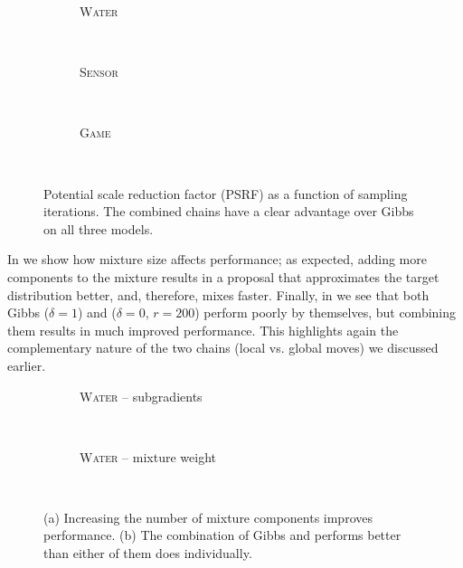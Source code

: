 \setlength{}
\setlength{}
\renewcommand{\subflen}{1.0\textwidth}
\begin{figure}[htbp]
  \begin{subfigure}[b]{\subflen}
    \centering
    
    \vspace{-0.5em}
    \caption{\textsc{Water}}
    \label{fig:water1}
  \end{subfigure}\\[1em]
  \begin{subfigure}[b]{\subflen}
    \centering
    
    \vspace{-0.5em}
    \caption{\textsc{Sensor}}
    \label{fig:berkeley1}
  \end{subfigure}\\[1em]
  \begin{subfigure}[b]{\subflen}
    \centering
    
    \vspace{-0.5em}
    \caption{\textsc{Game}}
    \label{fig:hots1}
  \end{subfigure}\\[-0.5em]
  \caption{
    Potential scale reduction factor (PSRF) as a function of sampling iterations.
    The combined chains have a clear advantage over Gibbs on all three models.
    }
  \label{fig:expsamples}
\end{figure}

In  we show how mixture size affects performance; as expected, adding more components to the mixture results in a proposal that approximates the target distribution better, and, therefore, mixes faster.
Finally, in  we see that both Gibbs ($\delta = 1$) and \Ms{} ($\delta = 0$, $r = 200$) perform poorly by themselves, but combining them results in much improved performance.
This highlights again the complementary nature of the two chains (local vs. global moves) we discussed earlier.

\setlength{}
\setlength{}
\renewcommand{\subflen}{\textwidth}
\begin{figure}[htbp]
  \begin{subfigure}[b]{\subflen}
    \centering
    
    \caption{\textsc{Water} -- subgradients}
    \label{fig:water2}
  \end{subfigure}\\[2em]
  \begin{subfigure}[b]{\subflen}
    \centering
    
    \caption{\textsc{Water} -- mixture weight}
    \label{fig:water3}
  \end{subfigure}\\
  \caption{
    (a) Increasing the number of mixture components improves performance.
    (b) The combination of Gibbs and \Ms{} performs better than either of them does individually.
  }
  \label{fig:exp2}
\end{figure}

